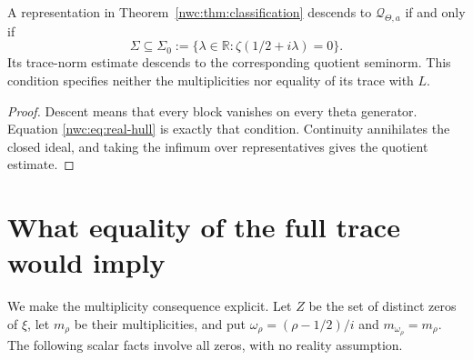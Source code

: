 \begin{corollary}\label{nwc:cor:theta-recipient}
A representation in Theorem~\ref{nwc:thm:classification} descends
to $\mathcal Q_{\Theta,a}$ if and only if
\[
 \Sigma\subseteq\Sigma_0
   :=\{\lambda\in\mathbb R:\zeta(1/2+i\lambda)=0\}.
\]
Its trace-norm estimate descends to the corresponding quotient
seminorm. This condition specifies neither the multiplicities nor
equality of its trace with $L$.
\end{corollary}
\begin{proof}
Descent means that every block vanishes on every theta generator.
Equation \eqref{nwc:eq:real-hull} is exactly that condition.
Continuity annihilates the closed ideal, and taking the infimum over
representatives gives the quotient estimate.
\end{proof}

\section{What equality of the full trace would imply}

We make the multiplicity consequence explicit. Let $Z$ be the set
of distinct zeros of $\xi$, let $m_\rho$ be their multiplicities,
and put $\omega_\rho=(\rho-1/2)/i$ and $m_{\omega_\rho}=m_\rho$.
The following scalar facts involve all zeros, with no reality assumption.

